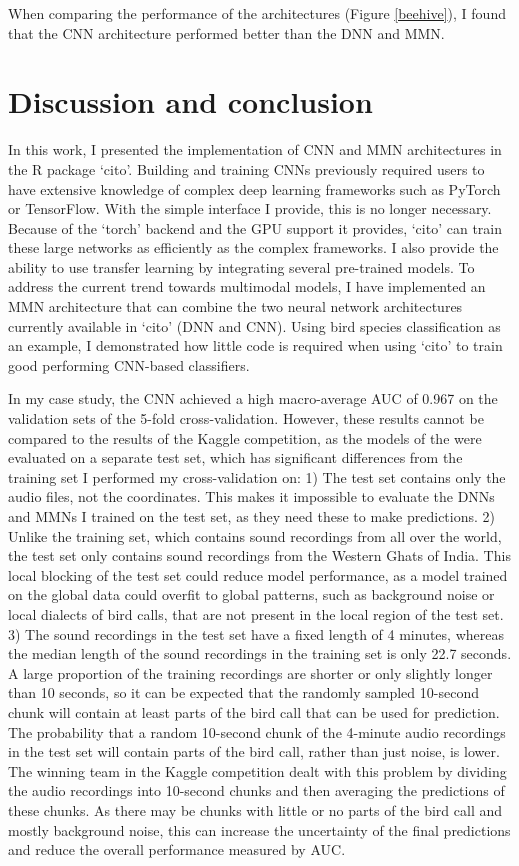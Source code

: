 \documentclass[12pt,twoside]{scrreport}
\newcommand{\pkg}[1]{`#1'}
\begin{document}
When comparing the performance of the architectures (Figure \ref{beehive}), I found that the CNN architecture performed better than the DNN and MMN.


\chapter*{Discussion and conclusion}
In this work, I presented the implementation of CNN and MMN architectures in the R package \pkg{cito}. Building and training CNNs previously required users to have extensive knowledge of complex deep learning frameworks such as PyTorch or TensorFlow. With the simple interface I provide, this is no longer necessary. Because of the \pkg{torch} backend and the GPU support it provides, \pkg{cito} can train these large networks as efficiently as the complex frameworks. I also provide the ability to use transfer learning by integrating several pre-trained models. To address the current trend towards multimodal models, I have implemented an MMN architecture that can combine the two neural network architectures currently available in \pkg{cito} (DNN and CNN). Using bird species classification as an example, I demonstrated how little code is required when using \pkg{cito} to train good performing CNN-based classifiers.

In my case study, the CNN achieved a high macro-average AUC of 0.967 on the validation sets of the 5-fold cross-validation. However, these results cannot be compared to the results of the Kaggle competition, as the models of the were evaluated on a separate test set, which has significant differences from the training set I performed my cross-validation on: 1) The test set contains only the audio files, not the coordinates. This makes it impossible to evaluate the DNNs and MMNs I trained on the test set, as they need these to make predictions. 2) Unlike the training set, which contains sound recordings from all over the world, the test set only contains sound recordings from the Western Ghats of India. This local blocking of the test set could reduce model performance, as a model trained on the global data could overfit to global patterns, such as background noise or local dialects of bird calls, that are not present in the local region of the test set. 3) The sound recordings in the test set have a fixed length of 4 minutes, whereas the median length of the sound recordings in the training set is only 22.7 seconds. A large proportion of the training recordings are shorter or only slightly longer than 10 seconds, so it can be expected that the randomly sampled 10-second chunk will contain at least parts of the bird call that can be used for prediction. The probability that a random 10-second chunk of the 4-minute audio recordings in the test set will contain parts of the bird call, rather than just noise, is lower. The winning team in the Kaggle competition dealt with this problem by dividing the audio recordings into 10-second chunks and then averaging the predictions of these chunks. As there may be chunks with little or no parts of the bird call and mostly background noise, this can increase the uncertainty of the final predictions and reduce the overall performance measured by AUC. 
\end{document}
